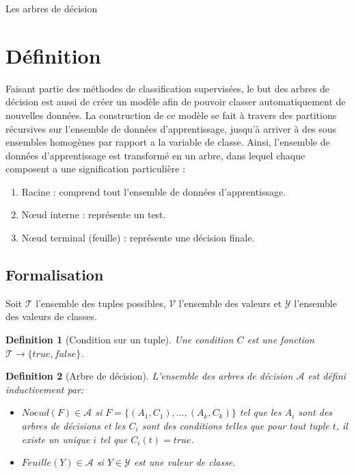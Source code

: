 \documentclass[a4paper, 11pt]{report}
\newtheorem{definition}{Definition}
\newcommand{\set}[1]{\ensuremath{\overline{#1}}}
\newcommand{\tupleset}{\ensuremath{\mathcal{T}}}
\newcommand{\arbreset}{\ensuremath{\mathcal{A}}}
\newcommand{\classeset}{\ensuremath{\mathcal{Y}}}
\newcommand{\valeurset}{\ensuremath{\mathcal{V}}}
\begin{document}
\begin{chapter}{Les arbres de décision}
\section{Définition}
Faisant partie des méthodes de classification supervisées, le but des arbres de décision est aussi de créer un modèle afin de pouvoir classer automatiquement de nouvelles données. La construction de ce modèle se fait à travers des partitions récursives sur l'ensemble de données d'apprentissage, jusqu'à arriver à des sous ensembles homogènes par rapport a la variable de classe. Ainsi, l'ensemble de données d'apprentissage est transformé en un arbre, dans lequel chaque composent a une signification particulière :
\begin{enumerate}
\item Racine : comprend tout l'ensemble de données d'apprentissage. 
\item Nœud interne : représente un test.
\item Nœud terminal (feuille) : représente une décision finale.
\end{enumerate}

\subsection{Formalisation}
\label{sec:formalisation}

Soit $\tupleset$ l'ensemble des tuples possibles, $\valeurset$ l'ensemble des valeurs et $\classeset$ l'ensemble des valeurs de classes.

\begin{definition}[Condition sur un tuple]
  Une condition $C$ est une fonction $\tupleset\rightarrow\{true,false\}$.
\end{definition}

\begin{definition}[Arbre de décision]
  L'ensemble des arbres de décision $\arbreset$ est défini inductivement par:
  \begin{itemize}
  \item $Noeud(F)\in\arbreset$ si $F=\{(A_1,C_1),\dots,(A_k,C_k)\}$ tel que les $A_i$ sont des arbres de décisions et les $C_i$ sont des conditions telles que pour tout tuple $t$, il existe un unique $i$ tel que $C_i(t)=true$. 
  \item $Feuille(Y)\in\arbreset$ si $Y\in\classeset$ est une valeur de classe.
  \end{itemize}
\end{definition}


\end{chapter}
\end{document}
